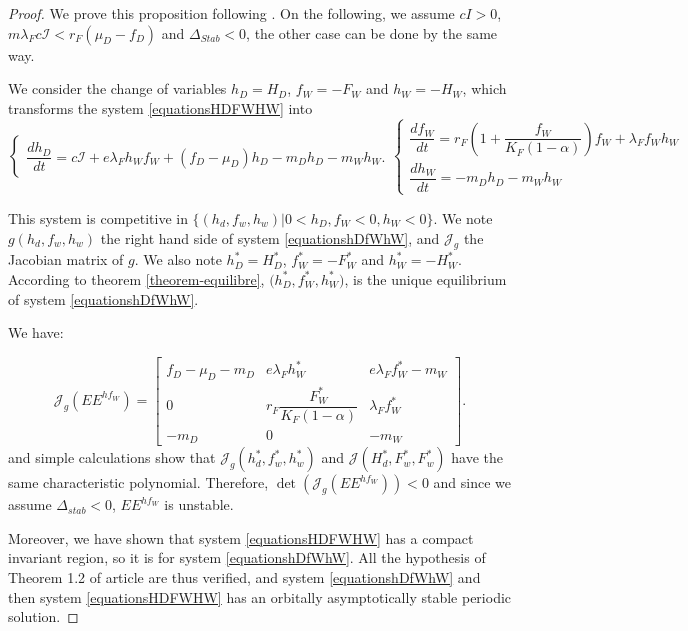 \documentclass{article}
\newcommand{\lfw}{\lambda_{F}}
\newcommand{\lfw}{\lambda_{F}}
\begin{document}
\begin{proof}
We prove this proposition following \cite{wang_predator-prey_1997}. On the following, we assume $cI > 0$, $m \lfw c\mathcal{I}< r_F (\mu_D -f_D)$ and $\Delta_{Stab} < 0$, the other case can be done by the same way.

We consider the change of variables $h_D = H_D$, $f_W = -F_W$ and $h_W = - H_W$, which transforms the system \eqref{equationsHDFWHW} into
\begin{subequations}
\begin{equation}
\left\{ \begin{array}{l}
\dfrac{dh_D}{dt}= c\mathcal{I} + e\lfw h_W f_W + (f_D - \mu_D) h_D - m_D h_D - m_W h_W.
\end{array}\right.
\end{equation}
\begin{equation}
\left\lbrace \begin{array}{l}
\dfrac{df_W}{dt} = r_F \left(1 + \dfrac{f_W}{K_F(1-\alpha)} \right) f_W + \lfw f_W h_W \\
\dfrac{dh_W}{dt}= -m_D h_D - m_W h_W 
\end{array} \right.
\end{equation}
\label{equationshDfWhW}
\end{subequations}

This system is competitive in $\Big\{(h_d, f_w, h_w) | 0 < h_D, f_W < 0, h_W < 0 \Big\}$.  We note $g(h_d, f_w, h_w)$ the right hand side of system \eqref{equationshDfWhW}, and $\mathcal{J}_g$ the Jacobian matrix of $g$. We also note $h_D^* = H_D^*$, $f_W^* = -F_W^*$ and $h_W^* = -H_W^*$. According to theorem \ref{theorem-equilibre}, $\Big(h_D^*, f_W^*, h_W^* \Big)$, is the unique equilibrium of system \eqref{equationshDfWhW}. 

We have:

\begin{equation*}
\mathcal{J}_g(EE^{h f_W}) = \begin{bmatrix}
f_D -\mu_D - m_D & e \lfw h_W^* & e \lfw f^*_W - m_W \\
0 & r_F \dfrac{F_W^*}{K_F(1-\alpha)} & \lfw f_W^* \\
-m_D & 0 & -m_W
\end{bmatrix}.
\end{equation*}
and simple calculations show that  $\mathcal{J}_g(h_d^*, f_w^*, h_w^*)$ and $\mathcal{J}(H_d^*, F_w^*, F_w^*)$ have the same characteristic polynomial. Therefore, $\det( \mathcal{J}_g(EE^{h f_W})) < 0$ and since we assume $\Delta_{stab} < 0$, $EE^{h f_W}$ is unstable.

Moreover, we have shown that system \eqref{equationsHDFWHW} has a compact invariant region, so it is for system \eqref{equationshDfWhW}. All the hypothesis of Theorem 1.2 of article \cite{zhu_stable_1994} are thus verified, and system \eqref{equationshDfWhW} and  then system \eqref{equationsHDFWHW} has an orbitally asymptotically stable periodic solution.

\end{proof}
\end{document}
